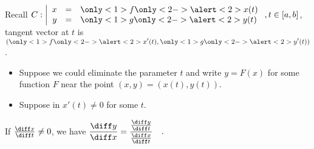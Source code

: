 \begin{frame}
Recall $C:\left|\begin{array}{rcl}x&=&\only<1>{f}\only<2->{\alert<2>{x}}(t)\\y&=& \only<1>{g}\only<2->{\alert<2>{y}}(t)\end{array} \right., t\in [a,b]$, tangent vector at $t$ is $(\only<1>{f}\only<2->{\alert<2>{x}}'(t), \only<1>{g}\only<2->{\alert<2>{y}}'(t))$. 

\begin{itemize}
\item<3-> Suppose we could eliminate the parameter $t$ and write $y=F(x)$ for some function $F$ near the point $(x,y)=(x(t), y(t))$. 
\item<4-> Suppose in $x'(t)\neq 0$ for some $t$. 
\end{itemize}
\begin{observation}
If $\frac{\diff x}{\diff t}\neq 0$, we have $\displaystyle \frac{ \diff y}{ \diff x}= \frac{\frac{\diff y}{\diff t}}{\frac{\diff x}{\diff t}}\quad .
$
\end{observation}
\end{frame}
